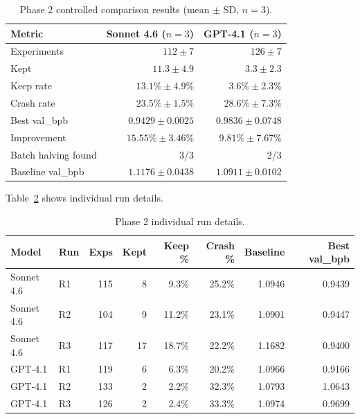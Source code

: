 \documentclass[11pt]{article}
\begin{document}
\begin{table}[H]
\centering
\caption{Phase 2 controlled comparison results (mean $\pm$ SD, $n=3$).}
\label{tab:phase2_results}
\begin{tabular}{lrr}
\toprule
\textbf{Metric} & \textbf{Sonnet 4.6 ($n=3$)} & \textbf{GPT-4.1 ($n=3$)} \\
\midrule
Experiments          & $112 \pm 7$               & $126 \pm 7$              \\
Kept                 & $11.3 \pm 4.9$            & $3.3 \pm 2.3$           \\
Keep rate            & $13.1\% \pm 4.9\%$        & $3.6\% \pm 2.3\%$       \\
Crash rate           & $23.5\% \pm 1.5\%$        & $28.6\% \pm 7.3\%$      \\
Best val\_bpb        & $0.9429 \pm 0.0025$       & $0.9836 \pm 0.0748$     \\
Improvement          & $15.55\% \pm 3.46\%$      & $9.81\% \pm 7.67\%$     \\
Batch halving found  & 3/3                        & 2/3                     \\
Baseline val\_bpb    & $1.1176 \pm 0.0438$       & $1.0911 \pm 0.0102$     \\
\bottomrule
\end{tabular}
\end{table}

Table~\ref{tab:phase2_individual} shows individual run details.

\begin{table}[H]
\centering
\caption{Phase 2 individual run details.}
\label{tab:phase2_individual}
\begin{tabular}{llrrrrrr}
\toprule
\textbf{Model} & \textbf{Run} & \textbf{Exps} & \textbf{Kept} & \textbf{Keep \%} & \textbf{Crash \%} & \textbf{Baseline} & \textbf{Best val\_bpb} \\
\midrule
Sonnet 4.6 & R1 & 115 & 8  & 9.3\%  & 25.2\% & 1.0946 & 0.9439 \\
Sonnet 4.6 & R2 & 104 & 9  & 11.2\% & 23.1\% & 1.0901 & 0.9447 \\
Sonnet 4.6 & R3 & 117 & 17 & 18.7\% & 22.2\% & 1.1682 & 0.9400 \\
\midrule
GPT-4.1    & R1 & 119 & 6  & 6.3\%  & 20.2\% & 1.0966 & 0.9166 \\
GPT-4.1    & R2 & 133 & 2  & 2.2\%  & 32.3\% & 1.0793 & 1.0643 \\
GPT-4.1    & R3 & 126 & 2  & 2.4\%  & 33.3\% & 1.0974 & 0.9699 \\
\bottomrule
\end{tabular}
\end{table}
\end{document}
